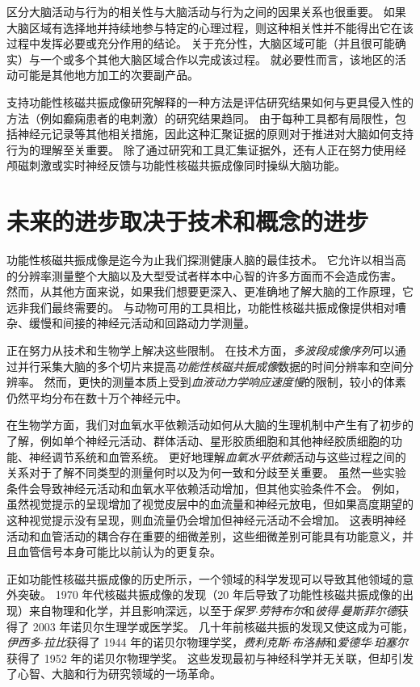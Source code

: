 区分大脑活动与行为的相关性与大脑活动与行为之间的因果关系也很重要。
如果大脑区域有选择地并持续地参与特定的心理过程，则这种相关性并不能得出它在该过程中发挥必要或充分作用的结论。
关于充分性，大脑区域可能（并且很可能确实）与一个或多个其他大脑区域合作以完成该过程。
就必要性而言，该地区的活动可能是其他地方加工的次要副产品。


支持功能性核磁共振成像研究解释的一种方法是评估研究结果如何与更具侵入性的方法（例如癫痫患者的电刺激）的研究结果趋同。
由于每种工具都有局限性，包括神经元记录等其他相关措施，因此这种汇聚证据的原则对于推进对大脑如何支持行为的理解至关重要。
除了通过研究和工具汇集证据外，还有人正在努力使用经颅磁刺激或实时神经反馈与功能性核磁共振成像同时操纵大脑功能。




\section{未来的进步取决于技术和概念的进步}

功能性核磁共振成像是迄今为止我们探测健康人脑的最佳技术。
它允许以相当高的分辨率测量整个大脑以及大型受试者样本中心智的许多方面而不会造成伤害。
然而，从其他方面来说，如果我们想要更深入、更准确地了解大脑的工作原理，它远非我们最终需要的。
与动物可用的工具相比，功能性核磁共振成像提供相对嘈杂、缓慢和间接的神经元活动和回路动力学测量。


正在努力从技术和生物学上解决这些限制。
在技术方面，\textit{多波段成像序列}可以通过并行采集大脑的多个切片来提高\textit{功能性核磁共振成像}数据的时间分辨率和空间分辨率。
然而，更快的测量本质上受到\textit{血液动力学响应速度慢}的限制，较小的体素仍然平均分布在数十万个神经元中。


在生物学方面，我们对血氧水平依赖活动如何从大脑的生理机制中产生有了初步的了解，例如单个神经元活动、群体活动、星形胶质细胞和其他神经胶质细胞的功能、神经调节系统和血管系统。
更好地理解\textit{血氧水平依赖}活动与这些过程之间的关系对于了解不同类型的测量何时以及为何一致和分歧至关重要。 
虽然一些实验条件会导致神经元活动和血氧水平依赖活动增加，但其他实验条件不会。
例如，虽然视觉提示的呈现增加了视觉皮层中的血流量和神经元放电，但如果高度期望的这种视觉提示没有呈现，则血流量仍会增加但神经元活动不会增加。
这表明神经活动和血管活动的耦合存在重要的细微差别，这些细微差别可能具有功能意义，并且血管信号本身可能比以前认为的更复杂。


正如功能性核磁共振成像的历史所示，一个领域的科学发现可以导致其他领域的意外突破。
1970 年代核磁共振成像的发现（20 年后导致了功能性核磁共振成像的出现）来自物理和化学，并且影响深远，以至于\textit{保罗$\cdot$劳特布尔}和\textit{彼得$\cdot$曼斯菲尔德}获得了 2003 年诺贝尔生理学或医学奖。
几十年前核磁共振的发现又使这成为可能，\textit{伊西多$\cdot$拉比}获得了 1944 年的诺贝尔物理学奖，\textit{费利克斯$\cdot$布洛赫}和\textit{爱德华$\cdot$珀塞尔}获得了 1952 年的诺贝尔物理学奖。
这些发现最初与神经科学并无关联，但却引发了心智、大脑和行为研究领域的一场革命。


